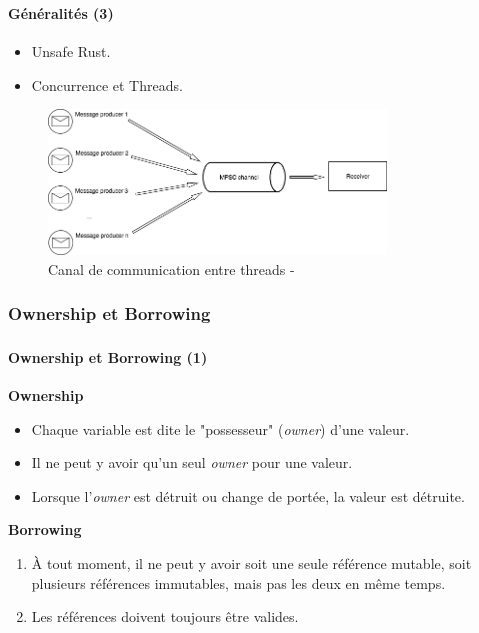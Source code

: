 \documentclass[10pt]{beamer}
\begin{document}
\begin{frame}
    \frametitle{\subsecname}
    \framesubtitle{Généralités (3)}
    \begin{itemize}
        \item Unsafe Rust.
        \item Concurrence et Threads.
    \end{itemize}
    \begin{figure}
        \begin{center}
            \includegraphics[width=0.8\textwidth]{images/mpsc.png}
            \caption{Canal de communication entre threads - \cite{ref37}}
        \end{center}
    \end{figure}
\end{frame}

\subsubsection{Ownership et Borrowing}
\begin{frame}
    \frametitle{\subsecname}
    \framesubtitle{Ownership et Borrowing (1)}
    \textbf{Ownership}
    \begin{itemize}
        \item Chaque variable est dite le "possesseur" (\textit{owner}) d'une valeur.
        \item Il ne peut y avoir qu'un seul \textit{owner} pour une valeur.
        \item Lorsque l'\textit{owner} est détruit ou change de portée, la valeur est détruite.
    \end{itemize}
    \bigbreak
    \textbf{Borrowing}
    \begin{enumerate}
        \item À tout moment, il ne peut y avoir soit une seule référence mutable, soit plusieurs 
            références immutables, mais pas les deux en même temps.
        \item Les références doivent toujours être valides.
    \end{enumerate}
\end{frame}
\end{document}
